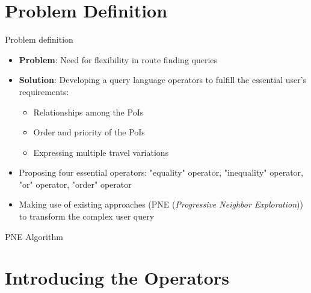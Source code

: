 \documentclass[18pt]{beamer}
\begin{document}
\section{Problem Definition}
	\begin{frame}{Problem definition}
	
		\begin{itemize}
			\item \textbf{Problem}: Need for flexibility in route finding queries
			\item \textbf{Solution}: Developing a query language operators to fulfill the essential user's requirements:
			\begin{itemize}
				\item Relationships among the PoIs
				\item Order and priority of the PoIs
				\item Expressing multiple travel variations
				\newline
			\end{itemize}
		    \pause
		    \item Proposing four essential operators: "equality" operator, "inequality" operator, "or" operator, "order" operator
		    \item Making use of existing approaches (PNE (\textit{Progressive Neighbor Exploration})) to transform the complex user query 
		\end{itemize}
	
	\end{frame}

		\bigbreak
	\begin{frame}{PNE Algorithm}
	\end{frame}

\section{Introducing the Operators}
\end{document}

